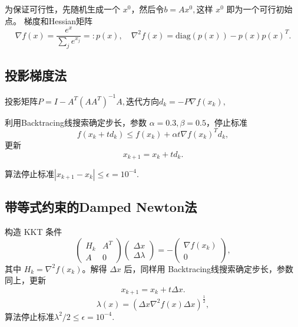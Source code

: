 \documentclass{homework}
\begin{document}
\begin{sol}
    

为保证可行性，先随机生成一个 $x^0$，然后令$b=A x^0, $这样 $x^0$ 即为一个可行初始点。
梯度和Hessian矩阵
$$
 \nabla f(x)=\frac{e^x}{\sum_j e^{x_j}}=:p(x),
\quad \nabla^2 f(x)=\mathrm{diag}(p(x))-p(x)p(x)^T.
$$

\subsection*{投影梯度法}

投影矩阵$ P=I-A^T(AA^T)^{-1}A,$迭代方向$ d_k=-P\nabla f(x_k),$

利用Backtracing线搜索确定步长，参数 $\alpha = 0.3, \beta = 0.5$，停止标准
$$ f(x_k+t d_k)\le f(x_k)+\alpha t\nabla f(x_k)^T d_k,$$
更新$$ x_{k+1}=x_k+t d_k.$$

算法停止标准$| x_{k+1}-x_k|\le \epsilon = 10^{-4}.$

\subsection*{带等式约束的Damped Newton法}

构造 KKT 条件
$$
 \begin{pmatrix} H_k & A^T \\ A & 0 \end{pmatrix}
 \begin{pmatrix} \Delta x \\ \Delta\lambda \end{pmatrix}
 = -\begin{pmatrix} \nabla f(x_k) \\ 0 \end{pmatrix},
$$
其中 $H_k=\nabla^2 f(x_k)$。解得 $\Delta x$ 后，同样用 Backtracing线搜索确定步长，参数同上，更新
$$ x_{k+1}=x_k+t\Delta x.$$
$$\lambda(x) = (\Delta x \nabla^2f(x) \Delta x)^{\frac12},$$
算法停止标准$\lambda^2/2\le \epsilon = 10^{-4}.$


\end{sol}
\end{document}
